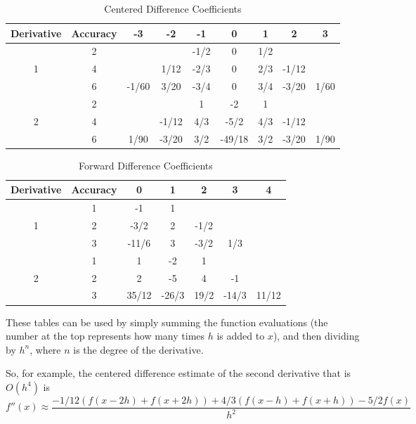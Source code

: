 \begin{table}
\begin{center}
\begin{tabular}{|c|c|c|c|c|c|c|c|c|}
\hline
Derivative & Accuracy & -3 & -2 & -1 & 0 & 1 & 2 & 3 \\ \hline
 & 2 & & & -1/2 & 0 & 1/2 & & \\ \cline{2-9}
 1 & 4 & & 1/12 & -2/3 &  0 & 2/3 & -1/12 & \\ \cline{2-9}
  & 6 & -1/60 & 3/20 & -3/4 & 0 & 3/4 & -3/20 & 1/60 \\ \hline
  & 2 & & & 1 & -2 & 1 & & \\ \cline{2-9}
 2 & 4 & & -1/12 & 4/3 &  -5/2 & 4/3 & -1/12 & \\ \cline{2-9}
  & 6 & 1/90 & -3/20 & 3/2 & -49/18 & 3/2 & -3/20 & 1/90 \\ \hline
\end{tabular}
\caption{Centered Difference Coefficients}
\label{Table:CDiff}
\end{center}
\end{table}

\begin{table}
\begin{center}
\begin{tabular}{|c|c|c|c|c|c|c|}
\hline
Derivative & Accuracy & 0 & 1 & 2 & 3 & 4 \\ \hline
 & 1 & -1 & 1 &  & &  \\ \cline{2-7}
 1 & 2 & -3/2 & 2 & -1/2 & &  \\ \cline{2-7}
  & 3 & -11/6 & 3 & -3/2 & 1/3 &  \\ \hline
  & 1 & 1 & -2 & 1 &  & \\ \cline{2-7}
 2 & 2 & 2 & -5 & 4 &  -1 &  \\ \cline{2-7}
  & 3 & 35/12 & -26/3 & 19/2 & -14/3 & 11/12 \\ \hline
\end{tabular}
\caption{Forward Difference Coefficients}
\label{Table:FDiff}
\end{center}
\end{table}

These tables can be used by simply summing the function evaluations (the number at the top represents how many times $h$ is added to $x$), and then dividing by $h^n$, where $n$ is the degree of the derivative.

So, for example, the centered difference estimate of the second derivative that is $O(h^4)$ is
\begin{equation*}
f''(x) \approx \frac{-1/12(f(x-2h) + f(x+2h)) + 4/3(f(x-h) + f(x+h)) -5/2f(x)}{h^2}
\end{equation*}

